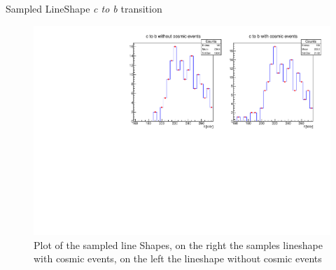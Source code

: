 \documentclass[8pt]{beamer}
\begin{document}
\begin{frame}{Sampled LineShape \textit{c to b} transition}

\begin{figure}[hbtp]
\centering
\includegraphics[width = \textwidth]{ExampleOfGeneration.pdf}
\caption{Plot of the sampled line Shapes, on the right the samples lineshape with cosmic events, on the left the lineshape without cosmic events}
\end{figure}


\end{frame}
\end{document}
